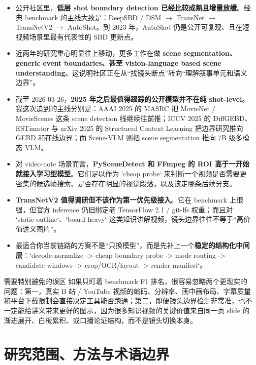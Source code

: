 \documentclass[a4paper]{article}
\begin{document}
\begin{itemize}
\item 公开社区里，\textbf{低层 shot boundary detection 已经比较成熟且增量放缓}。经典 benchmark 的主线大致是：DeepSBD / DSM $\rightarrow$ TransNet $\rightarrow$ TransNetV2 $\rightarrow$ AutoShot。到 2023 年，AutoShot 仍是公开可复现、且在短视频场景里最有代表性的 SBD 更新点。
\item 近两年的研究重心明显往上移动，更多工作在做 \textbf{scene segmentation、generic event boundaries、甚至 vision-language based scene understanding}。这说明社区正在从“找镜头断点”转向“理解叙事单元和语义边界”。
\item 截至 2026-03-26，\textbf{2025 年之后最值得跟踪的公开模型并不在纯 shot-level}。我这次追到的主线分别是：AAAI 2025 的 MASRC 把 MovieNet / MovieScenes 这条 scene detection 线继续往前推；ICCV 2025 的 DiffGEBD、ESTimator 与 arXiv 2025 的 Structured Context Learning 把边界研究推向 GEBD 和在线边界；而 Scene-VLM 则把 scene segmentation 推向 7B 级多模态 VLM。
\item 对 video-note 场景而言，\textbf{PySceneDetect 和 FFmpeg 的 ROI 高于一开始就接入学习型模型}。它们足以作为 `cheap probe` 来判断一个视频是否需要更密集的候选帧搜索、是否存在明显的视觉段落，以及该走哪条后续分支。
\item \textbf{TransNetV2 值得调研但不该作为第一优先级接入}。它在 benchmark 上很强，但官方 inference 仍旧绑定老 TensorFlow 2.1 / git-lfs 权重；而且对 `static-outline`、`board-heavy` 这类知识讲解视频，镜头边界往往不等于“高价值讲义图片”。
\item 最适合你当前链路的方案不是“只换模型”，而是先补上一个\textbf{稳定的结构化中间层}：`decode-normalize -> cheap boundary probe -> mode routing -> candidate windows -> crop/OCR/layout -> render manifest`。
\end{itemize}

\begin{riskbox}{需要特别避免的误区}
如果只盯着 benchmark F1 排名，很容易忽略两个更现实的问题：第一，真实 B 站 / YouTube 视频的编码、分辨率、画中画布局、字幕质量和平台下载限制会直接决定工具能否跑通；第二，即便镜头边界检测非常准，也不一定能给讲义带来更好的图示，因为很多知识视频的关键价值来自同一页 slide 的渐进展开、白板累积、或口播论证结构，而不是镜头切换本身。
\end{riskbox}

\section{研究范围、方法与术语边界}
\end{document}
